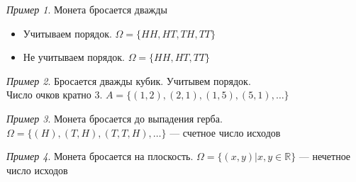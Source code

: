 \documentclass[english]{article}
\newcommand{\R}{\mathbb{R}}
\theoremstyle{plain}
\theoremstyle{remark}
\newtheorem*{examp}{Пример}
\theoremstyle{definition}
\begin{document}
\begin{examp}
Монета бросается дважды
\begin{itemize}
\item Учитываем порядок. \(\Omega = \{HH, HT, TH, TT\}\)
\item Не учитываем порядок. \(\Omega = \{HH, HT, TT\}\)
\end{itemize}
\end{examp}
\begin{examp}
Бросается дважды кубик. Учитывем порядок. \\
Число очков кратно \(3\). \(A = \{ (1, 2), (2, 1), (1, 5), (5, 1), \dots \}\) 
\end{examp}
\begin{examp}
Монета бросается до выпадения герба. \(\Omega = \{ (H), (T, H), (T, T, H), \dots \}\) --- счетное число исходов
\end{examp}
\begin{examp}
Монета бросается на плоскость. \(\Omega = \{(x, y) \big\vert x, y \in \R\}\) --- нечетное число исходов
\end{examp}
\end{document}
